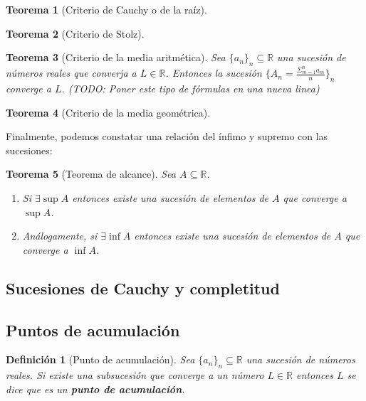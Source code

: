 \documentclass{article}
\newtheorem{theorem}{Teorema}
\newtheorem{define}{Definición}
\newcommand{\reales}{\mathbb{R}}
\newcommand{\sucreal}[1]{\{ #1 _n \}_n \subseteq \reales}
\begin{document}
\begin{theorem}[Criterio de Cauchy o de la raíz]

\end{theorem}

\begin{theorem}[Criterio de Stolz]

\end{theorem}

\begin{theorem}[Criterio de la media aritmética]
	Sea $\sucreal{a}$ una sucesión de números reales que converja a $L \in \reales$. Entonces la sucesión $\{ A_n = \frac{\Sigma_{m=1}^{n} a_m}{n} \}_n$ converge a $L$. (TODO: Poner este tipo de fórmulas en una nueva linea)
\end{theorem}

\begin{theorem}[Criterio de la media geométrica]

\end{theorem}

Finalmente, podemos constatar una relación del ínfimo y supremo con las sucesiones:

\begin{theorem}[Teorema de alcance]
	Sea $A \subseteq \reales$. 
\begin{enumerate}
\item
	Si $\exists \sup A$ entonces existe una sucesión de elementos de $A$ que converge a $\sup A$.
\item
	Análogamente, si $\exists \inf A$ entonces existe una sucesión de elementos de $A$ que converge a $\inf A$.
\end{enumerate}	

\end{theorem}



\subsection{Sucesiones de Cauchy y completitud}


\subsection{Puntos de acumulación}
\begin{define}[Punto de acumulación]
	Sea $\sucreal{a}$ una sucesión de números reales. Si existe una subsucesión que converge a un número $L \in \reales$ entonces $L$ se dice que es un \textbf{punto de acumulación}.
\end{define}
\end{document}
